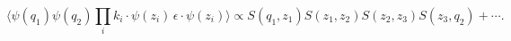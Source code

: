 \begin{equation}
\langle \psi(q_1)\psi(q_2) \prod_i k_i\cdot \psi(z_i) \,
\epsilon\cdot\psi(z_i) \rangle \propto S(q_1,z_1)
S(z_1,z_2)S(z_2,z_3) S(z_3,q_2)  + \cdots .
\end{equation}

